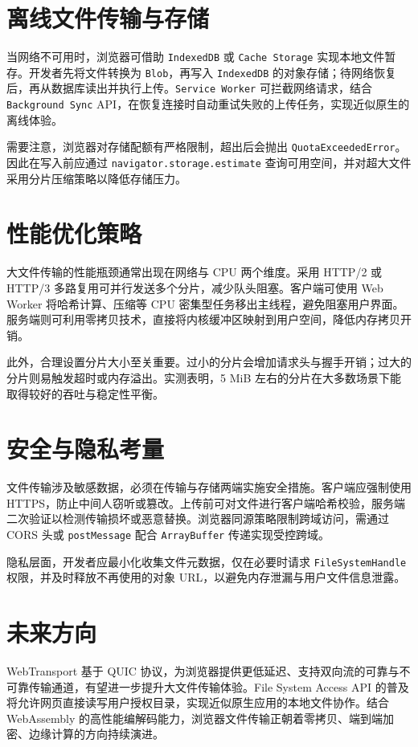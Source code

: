 \chapter{离线文件传输与存储}
当网络不可用时，浏览器可借助 \texttt{IndexedDB} 或 \texttt{Cache Storage} 实现本地文件暂存。开发者先将文件转换为 \texttt{Blob}，再写入 \texttt{IndexedDB} 的对象存储；待网络恢复后，再从数据库读出并执行上传。\texttt{Service Worker} 可拦截网络请求，结合 \texttt{Background Sync} API，在恢复连接时自动重试失败的上传任务，实现近似原生的离线体验。\par
需要注意，浏览器对存储配额有严格限制，超出后会抛出 \texttt{QuotaExceededError}。因此在写入前应通过 \texttt{navigator.storage.estimate} 查询可用空间，并对超大文件采用分片压缩策略以降低存储压力。\par
\chapter{性能优化策略}
大文件传输的性能瓶颈通常出现在网络与 CPU 两个维度。采用 HTTP/2 或 HTTP/3 多路复用可并行发送多个分片，减少队头阻塞。客户端可使用 Web Worker 将哈希计算、压缩等 CPU 密集型任务移出主线程，避免阻塞用户界面。服务端则可利用零拷贝技术，直接将内核缓冲区映射到用户空间，降低内存拷贝开销。\par
此外，合理设置分片大小至关重要。过小的分片会增加请求头与握手开销；过大的分片则易触发超时或内存溢出。实测表明，5 MiB 左右的分片在大多数场景下能取得较好的吞吐与稳定性平衡。\par
\chapter{安全与隐私考量}
文件传输涉及敏感数据，必须在传输与存储两端实施安全措施。客户端应强制使用 HTTPS，防止中间人窃听或篡改。上传前可对文件进行客户端哈希校验，服务端二次验证以检测传输损坏或恶意替换。浏览器同源策略限制跨域访问，需通过 CORS 头或 \texttt{postMessage} 配合 \texttt{ArrayBuffer} 传递实现受控跨域。\par
隐私层面，开发者应最小化收集文件元数据，仅在必要时请求 \texttt{FileSystemHandle} 权限，并及时释放不再使用的对象 URL，以避免内存泄漏与用户文件信息泄露。\par
\chapter{未来方向}
WebTransport 基于 QUIC 协议，为浏览器提供更低延迟、支持双向流的可靠与不可靠传输通道，有望进一步提升大文件传输体验。File System Access API 的普及将允许网页直接读写用户授权目录，实现近似原生应用的本地文件协作。结合 WebAssembly 的高性能编解码能力，浏览器文件传输正朝着零拷贝、端到端加密、边缘计算的方向持续演进。\par
